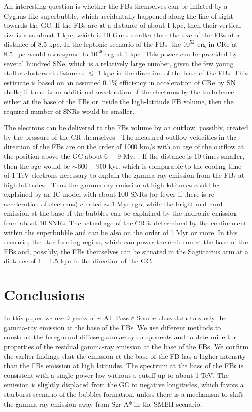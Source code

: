 An interesting question is whether the FBs themselves can be inflated by a Cygnus-like superbubble,
which accidentally happened along the line of sight towards the GC.
If the FBs are at a distance of about 1 kpc, then their vertical size is also about 1 kpc,
which is 10 times smaller than the size of the FBs at a distance of 8.5 kpc.
In the leptonic scenario of the FBs, the $10^{52}$ erg in CRe at 8.5 kpc \citep{2014ApJ...793...64A}
would correspond to $10^{50}$ erg at 1 kpc.
This power can be provided by several hundred SNe, which is a relatively large number, given the few young stellar 
clusters at distances $\lesssim$ 1 kpc in the direction of the base of the FBs.
This estimate is based on an assumed 0.1\% efficiency in acceleration of CRe by SN shells;
if there is an additional acceleration of the electrons by the turbulence either at the base of the FBs
or inside the high-latitude FB volume, then the required number of SNRs would be smaller.

The electrons can be delivered to the FBs volume by an outflow,
possibly, created by the pressure of the CR themselves \citep[e.g.,][]{2018MNRAS.475..570J}.
The measured outflow velocities in the direction of the FBs are on the order of 1000 km/s
with an age of the outflow at the position above the GC about 6 $-$ 9 Myr \citep{2015ApJ...799L...7F, 2017ApJ...834..191B}.
If the distance is 10 times smaller, then the age would be $\sim 600 - 900$ kyr,
which is comparable to the cooling time of 1 TeV electrons necessary to explain the 
gamma-ray emission from the FBs at high latitudes \citep{2014ApJ...793...64A}.
Thus the gamma-ray emission at high latitudes could be explained by an IC model with about 100 SNRs
(or fewer if there is re-acceleration of electrons)
created $\sim$ 1 Myr ago, while the bright and hard emission at the base of the bubbles can
be explained by the hadronic emission from about 10 SNRs. 
The actual age of the CR is determined by the confinement within the superbubble and can be also on the order
of 1 Myr or more.
In this scenario,
the star-forming region, which can power the emission at the base of the FBs and, possibly, the FBs themselves
can be situated in the Sagittarius arm at a distance of 1 -- 1.5 kpc in the direction of the GC.


\section{Conclusions}

In this paper we use 9 years of \Fermi-LAT Pass 8 Source class data to study the gamma-ray emission
at the base of the FBs.
We use different methods to construct the foreground diffuse gamma-ray components and to determine
the properties of the residual gamma-ray emission at the base of the FBs.
We confirm the earlier findings that the emission at the base of the FB
has a higher intensity than the FBs emission at high latitudes.
The spectrum at the base of the FBs is consistent with a single power law without a cutoff up to about 1 TeV.
The emission is slightly displaced from the GC to negative longitudes,
which favors a starburst scenario of the bubbles formation, unless there is a mechanism to shift the
gamma-ray emission away from Sgr A* in the SMBH scenario.

